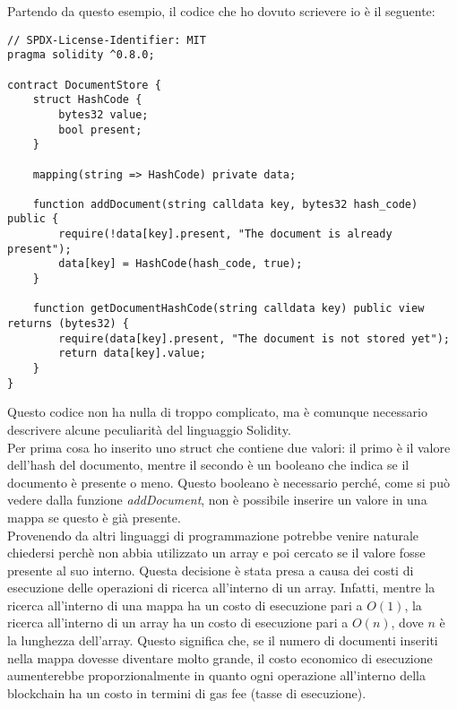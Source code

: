 \newpage

Partendo da questo esempio, il codice che ho dovuto scrievere io è il seguente:
\begin{lstlisting}[language=Solidity]
// SPDX-License-Identifier: MIT
pragma solidity ^0.8.0;

contract DocumentStore {
    struct HashCode {
        bytes32 value;
        bool present;
    }

    mapping(string => HashCode) private data;

    function addDocument(string calldata key, bytes32 hash_code) public {
        require(!data[key].present, "The document is already present");
        data[key] = HashCode(hash_code, true);
    }

    function getDocumentHashCode(string calldata key) public view returns (bytes32) {
        require(data[key].present, "The document is not stored yet");
        return data[key].value;
    }
}
\end{lstlisting}

Questo codice non ha nulla di troppo complicato, ma è comunque necessario
descrivere alcune peculiarità del linguaggio Solidity.\\
Per prima cosa ho inserito uno struct che contiene due valori: il primo è il
valore dell'hash del documento, mentre il secondo è un booleano che indica se
il documento è presente o meno. Questo booleano è necessario perché, come si
può vedere dalla funzione \textit{addDocument}, non è possibile inserire un
valore in una mappa se questo è già presente. \\
Provenendo da altri linguaggi di programmazione potrebbe venire naturale
chiedersi perchè non abbia utilizzato un array e poi cercato se il valore fosse
presente al suo interno. Questa decisione è stata presa a causa dei costi di
esecuzione delle operazioni di ricerca all'interno di un array. Infatti, mentre
la ricerca all'interno di una mappa ha un costo di esecuzione pari a $O(1)$, la
ricerca all'interno di un array ha un costo di esecuzione pari a $O(n)$, dove
$n$ è la lunghezza dell'array. Questo significa che, se il numero di documenti
inseriti nella mappa dovesse diventare molto grande, il costo economico di 
esecuzione aumenterebbe proporzionalmente in quanto ogni operazione all'interno
della blockchain ha un costo in termini di gas fee (tasse di esecuzione).

\newpage

